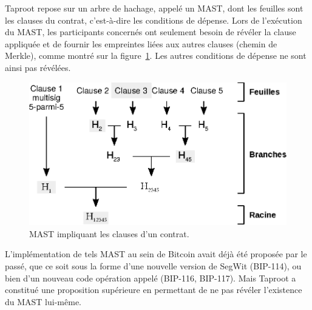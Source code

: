 Taproot repose sur un arbre de hachage, appelé un MAST, dont les feuilles sont les clauses du contrat, c'est-à-dire les conditions de dépense. Lors de l'exécution du MAST, les participants concernés ont seulement besoin de révéler la clause appliquée et de fournir les empreintes liées aux autres clauses (chemin de Merkle), comme montré sur la figure~\ref{fig:taproot-mast}. Les autres conditions de dépense ne sont ainsi pas révélées.

\begin{figure}[h]
  \centering
  \includegraphics[scale=0.75]{img/taproot-mast.eps}
  \caption{MAST impliquant les clauses d'un contrat.}
  \label{fig:taproot-mast}
\end{figure}

L'implémentation de tels MAST au sein de Bitcoin avait déjà été proposée par le passé, que ce soit sous la forme d'une nouvelle version de SegWit (BIP-114), ou bien d'un nouveau code opération appelé  (BIP-116, BIP-117). Mais Taproot a constitué une proposition supérieure en permettant de ne pas révéler l'existence du MAST lui-même.

